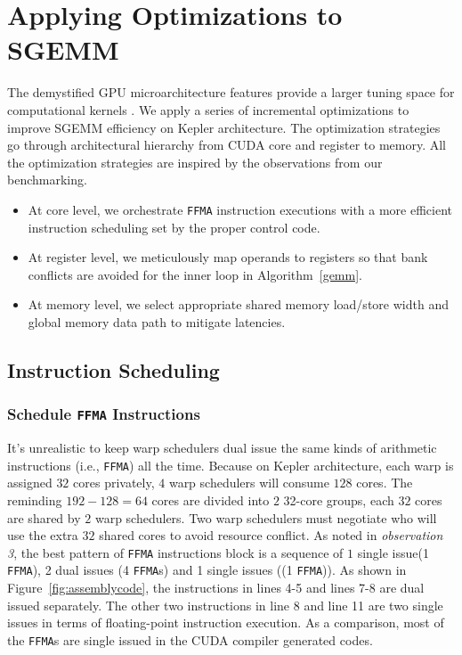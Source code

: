 \section{Applying Optimizations to SGEMM}
\label{sec:optimization}


The demystified GPU microarchitecture features provide a larger tuning space for computational kernels . 
We apply 
a series of incremental optimizations to improve SGEMM efficiency on Kepler architecture. The optimization strategies 
go through architectural hierarchy from CUDA core and register to memory. All the optimization strategies are inspired by the observations from our benchmarking.
\begin{itemize}
\item At core level, we orchestrate {\tt FFMA} instruction executions with a more efficient instruction scheduling set by the proper control code.
\item At register level, we meticulously map operands to registers so that bank conflicts are avoided for the inner loop in Algorithm~\ref{gemm}.
\item At memory level, we select appropriate shared memory load/store width and global memory data path to mitigate 
latencies.
\end{itemize}

\subsection{Instruction Scheduling}
\subsubsection{Schedule {\tt FFMA} Instructions}
It's unrealistic to keep warp schedulers dual issue the same kinds of arithmetic instructions (i.e., {\tt FFMA}) all 
the time. Because on Kepler architecture, each warp is assigned $32$ cores privately, $4$ warp schedulers will consume 
$128$ cores. The reminding $192-128=64$ cores are divided into $2$ 32-core groups, each $32$ cores 
are shared by $2$ warp schedulers. Two warp schedulers must negotiate who will use the extra $32$ shared cores to avoid 
resource conflict.
As noted in {\em observation 3}, the best pattern of {\tt FFMA} instructions block is a sequence of $1$ single issue(1 
{\tt FFMA}), 2 dual issues (4 {\tt FFMA}s) and 1 single issues ((1 {\tt FFMA})). As shown in 
Figure~\ref{fig:assemblycode}, the instructions in lines 4-5  and lines 7-8 are dual issued separately. 
The other two instructions in line 8 and line 11 are two single issues in terms of floating-point instruction 
execution. 
As a comparison, most of the {\tt FFMA}s are single issued in the CUDA compiler generated codes.

